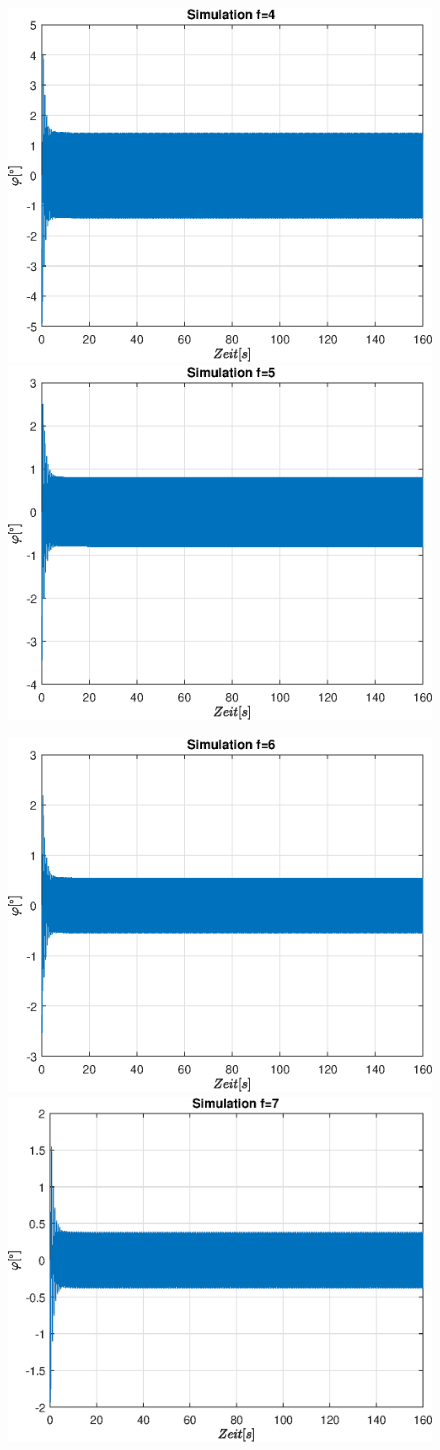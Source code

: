 \documentclass{article}
\begin{document}
\begin{figure}[!h]
\includegraphics[width=0.5\linewidth]{img/sim_phi_sine_freq_4}
\includegraphics[width=0.5\linewidth]{img/sim_phi_sine_freq_5}
\end{figure}
\begin{figure}[!h]
\includegraphics[width=0.5\linewidth]{img/sim_phi_sine_freq_6}
\includegraphics[width=0.5\linewidth]{img/sim_phi_sine_freq_7}
\end{figure}
\end{document}
